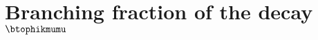 \section[Branching fraction of the decay \btophikmumu]{Branching fraction of the decay
  $\boldsymbol{\btophikmumu}$}
